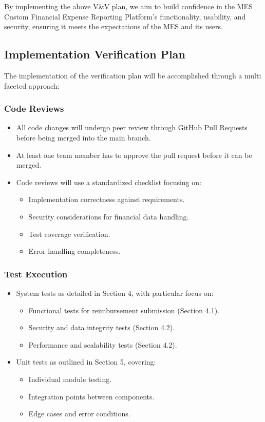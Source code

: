 \documentclass[12pt, titlepage]{article}
\begin{document}
By implementing the above V\&V plan, we aim to build confidence in the MES Custom Financial Expense Reporting Platform’s functionality, usability, and security, ensuring it meets the expectations of the MES and its users.

\subsection{Implementation Verification Plan}
The implementation of the verification plan will be accomplished through a multi faceted approach:

\subsubsection*{Code Reviews}
\begin{itemize}
  \item All code changes will undergo peer review through GitHub Pull Requests before being merged into the main branch.
  \item At least one team member has to approve the pull request before it can be merged.
  \item Code reviews will use a standardized checklist focusing on:
  \begin{itemize}
    \item Implementation correctness against requirements.
    \item Security considerations for financial data handling.
    \item Test coverage verification.
    \item Error handling completeness.
  \end{itemize}
\end{itemize}

\subsubsection*{Test Execution}
\begin{itemize}
  \item System tests as detailed in Section 4, with particular focus on:
  \begin{itemize}
    \item Functional tests for reimbursement submission (Section 4.1).
    \item Security and data integrity tests (Section 4.2).
    \item Performance and scalability tests (Section 4.2).
  \end{itemize}
  \item Unit tests as outlined in Section 5, covering:
  \begin{itemize}
    \item Individual module testing.
    \item Integration points between components.
    \item Edge cases and error conditions.
  \end{itemize}
\end{itemize}
\end{document}
